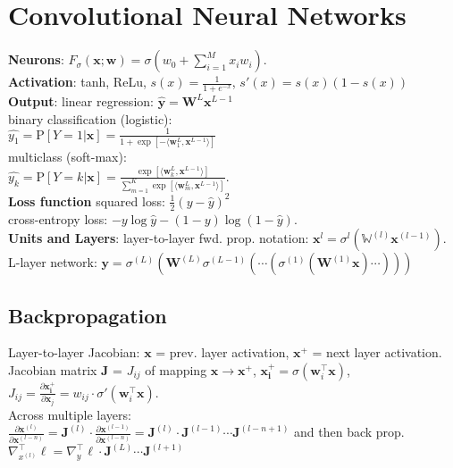 \section{Convolutional Neural Networks}
\textbf{Neurons}: $F_\sigma(\mathbf{x};\mathbf{w}) = \sigma(w_0 + \sum_{i=1}^M{x_iw_i})$.\\
\textbf{Activation}: tanh, ReLu, $s(x)=\frac{1}{1+e^{-x}}$, $s'(x)=s(x)(1-s(x))$\\
\textbf{Output}: linear regression: $\hat{\mathbf{y}} = \mathbf{W}^L\mathbf{x}^{L-1}$\\
binary classification (logistic):\\
$\hat{y_1} = \text{P}[Y=1|\mathbf{x}] = \frac{1}{1 + \exp[-\langle \mathbf{w}_1^L,\mathbf{x}^{L-1}\rangle]}$\\
multiclass (soft-max):\\
$\hat{y_k} = \text{P}[Y=k|\mathbf{x}]= \frac{\exp[\langle \mathbf{w}_k^L,\mathbf{x}^{L-1}\rangle]}{\sum_{m=1}^{K}{\exp[\langle \mathbf{w}_m^L, \mathbf{x}^{L-1}\rangle]}}$.\\
\textbf{Loss function} squared loss: $\frac{1}{2}(y - \hat{y})^2$\\
cross-entropy loss: $-y \log \hat{y} - (1-y)\log(1-\hat{y})$.\\
\textbf{Units and Layers}: layer-to-layer fwd. prop. notation: $\mathbf{x}^{l} = \sigma^{l}\left(\mathbb{W}^{\left(l\right)}\mathbf{x}^{\left(l-1\right)}\right)$. L-layer network: $\mathbf{y}=\sigma^{\left(L\right)}\left(\mathbf{W}^(L)\sigma^{(L-1)}\left(\cdots\left(\sigma^{(1)}\left(\mathbf{W}^{(1)}\mathbf{x}\right)\cdots\right)\right)\right)$
\subsection*{Backpropagation}
Layer-to-layer Jacobian: $\mathbf{x}$ = prev. layer activation, $\mathbf{x^+}$ = next layer activation. Jacobian matrix $\mathbf{J}$ = $J_{ij}$ of mapping $\mathbf{x}\rightarrow\mathbf{x^+}$, $\mathbf{x_i^+} = \sigma(\mathbf{w}_i^\top\mathbf{x})$, $J_{ij} = \frac{\partial \mathbf{x_i^+}}{\partial \mathbf{x}_j} = w_{ij}\cdot\sigma'(\mathbf{w}_i^\top\mathbf{x})$.\\
Across multiple layers:\\
$\frac{\partial\mathbf{x}^{(l)}}{\partial\mathbf{x}^{(l-n)}} = \mathbf{J}^{(l)}\cdot\frac{\partial\mathbf{x}^{(l-1)}}{\partial\mathbf{x}^{(l-n)}}=\mathbf{J}^{(l)}\cdot\mathbf{J}^{(l-1)}\cdots\mathbf{J}^{(l-n+1)}$ and then back prop. $ \nabla_{x^{(l)}}^\top\ell=\nabla_{y}^\top\ell\cdot\mathbf{J}^{(L)}\cdots\mathbf{J}^{(l+1)}$\\

